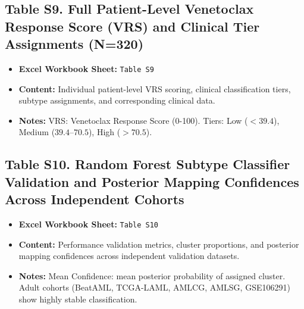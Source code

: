 \documentclass[11pt,a4paper]{article}
\begin{document}
\subsection*{Table S9. Full Patient-Level Venetoclax Response Score (VRS) and Clinical Tier Assignments (N=320)}
\hypertarget{tab:tabS9}{}
\label{tab:tabS9}
\begin{itemize}
    \item \textbf{Excel Workbook Sheet:} \texttt{Table S9}
    \item \textbf{Content:} Individual patient-level VRS scoring, clinical classification tiers, subtype assignments, and corresponding clinical data.
    \item \textbf{Notes:} VRS: Venetoclax Response Score (0-100). Tiers: Low ($<39.4$), Medium ($39.4$--$70.5$), High ($>70.5$).
\end{itemize}

\subsection*{Table S10. Random Forest Subtype Classifier Validation and Posterior Mapping Confidences Across Independent Cohorts}
\hypertarget{tab:tabS10}{}
\label{tab:tabS10}
\begin{itemize}
    \item \textbf{Excel Workbook Sheet:} \texttt{Table S10}
    \item \textbf{Content:} Performance validation metrics, cluster proportions, and posterior mapping confidences across independent validation datasets.
    \item \textbf{Notes:} Mean Confidence: mean posterior probability of assigned cluster. Adult cohorts (BeatAML, TCGA-LAML, AMLCG, AMLSG, GSE106291) show highly stable classification.
\end{itemize}
\end{document}
